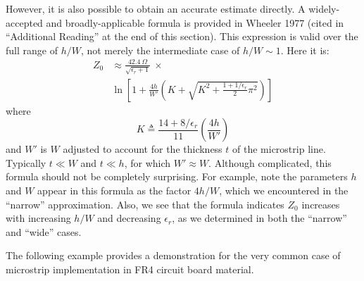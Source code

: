 However, it is also possible to obtain an accurate estimate directly.
A widely-accepted and broadly-applicable formula is provided in Wheeler 1977 (cited in ``Additional Reading'' at the end of this section).
This expression is valid over the full range of $h/W$, not merely the intermediate case of $h/W\sim 1$.
Here it is:
%
\begin{equation}
\begin{split}
Z_0 & \approx \frac{42.4~\Omega}{\sqrt{\epsilon_r+1}} ~\times \\
    &
\ln\left[
    1 +
    \frac{4h}{W'}
    \left( K + \sqrt{ K^2 + \frac{1+1/\epsilon_r}{2}\pi^2 } \right)
   \right]
\end{split}
\label{m0186_eWheeler10}
\end{equation}
% 
where
%
\begin{equation}
K \triangleq \frac{ 14 + 8/\epsilon_r }{ 11 } \left( \frac{4h}{W'} \right)
\end{equation}
%
and $W'$ is $W$ adjusted to account for the thickness $t$ of the microstrip line.  Typically $t\ll W$ and $t \ll h$, for which $W'\approx W$.
Although complicated, this formula should not be completely surprising.
For example, note the parameters $h$ and $W$ appear in this formula as the factor $4h/W$, which we encountered in the ``narrow'' approximation.
Also, we see that the formula indicates $Z_0$ increases with increasing $h/W$ and decreasing $\epsilon_r$, as we determined in both the ``narrow'' and ``wide'' cases.

The following example provides a demonstration for the very common case of microstrip implementation in FR4 
circuit board material.

